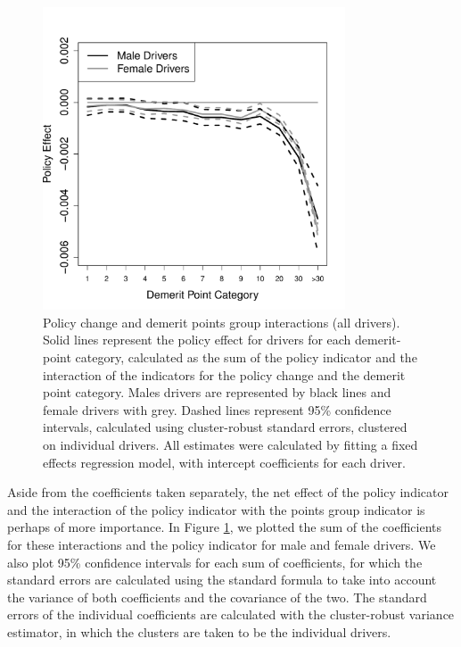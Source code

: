 \documentclass[12pt]{paper}
\begin{document}
\begin{figure}
\centering
\includegraphics[width=0.8\textwidth]{../Figures/FFX_reg_policy_points_grp_all_pts.pdf}
\caption{Policy change and demerit points group interactions (all drivers).
Solid lines represent the policy effect for drivers for each demerit-point category, 
calculated as the sum of the policy indicator and the interaction of the  indicators for the policy change 
and the demerit point category.  
Males drivers are represented by black lines and female drivers with grey. 
Dashed lines represent 95\% confidence intervals, 
calculated using cluster-robust standard errors, clustered on individual drivers. 
All estimates were calculated by fitting a fixed effects regression model, 
with intercept coefficients for each driver. 
}\label{fig:FE_regs_all_pts}
\end{figure}



Aside from the coefficients taken separately, the net effect of the policy indicator and the interaction of the policy 
indicator with the points group indicator is perhaps of more importance. 
In Figure \ref{fig:FE_regs_all_pts}, we plotted the sum of the coefficients for these interactions and the policy indicator for male and female drivers. 
We also plot 95\% confidence intervals for each sum of coefficients, 
for which the standard errors are calculated using the standard formula to take into account the variance of both coefficients and the covariance of the two.  
The standard errors of the individual coefficients are calculated with the cluster-robust variance estimator, 
in which the clusters are taken to be the individual drivers. 
\end{document}
